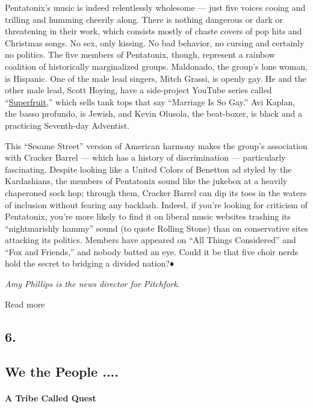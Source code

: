 Pentatonix's music is indeed relentlessly wholesome --- just five voices
cooing and trilling and humming cheerily along. There is nothing
dangerous or dark or threatening in their work, which consists mostly of
chaste covers of pop hits and Christmas songs. No sex, only kissing. No
bad behavior, no cursing and certainly no politics. The five members of
Pentatonix, though, represent a rainbow coalition of historically
marginalized groups. Maldonado, the group's lone woman, is Hispanic. One
of the male lead singers, Mitch Grassi, is openly gay. He and the other
male lead, Scott Hoying, have a side-project YouTube series called
``\href{https://www.youtube.com/user/sup3rfruit/featured}{Superfruit},''
which sells tank tops that say ``Marriage Is So Gay.'' Avi Kaplan, the
basso profundo, is Jewish, and Kevin Olusola, the beat-boxer, is black
and a practicing Seventh-day Adventist.

This ``Sesame Street'' version of American harmony makes the group's
association with Cracker Barrel --- which has a history of
discrimination --- particularly fascinating. Despite looking like a
United Colors of Benetton ad styled by the Kardashians, the members of
Pentatonix sound like the jukebox at a heavily chaperoned sock hop;
through them, Cracker Barrel can dip its toes in the waters of inclusion
without fearing any backlash. Indeed, if you're looking for criticism of
Pentatonix, you're more likely to find it on liberal music websites
trashing its ``nightmarishly hammy'' sound (to quote Rolling Stone) than
on conservative sites attacking its politics. Members have appeared on
``All Things Considered'' and ``Fox and Friends,'' and nobody batted an
eye. Could it be that five choir nerds hold the secret to bridging a
divided nation?♦

\emph{Amy Phillips is the news director for Pitchfork.}

Read more

\hypertarget{6}{%
\subsection{6.}\label{6}}

\hypertarget{---we-the-people-}{%
\subsection{\texorpdfstring{ We the People
....}{   We the People ....}}\label{---we-the-people-}}

\hypertarget{a-tribe-called-quest}{%
\paragraph{A Tribe Called Quest}\label{a-tribe-called-quest}}

